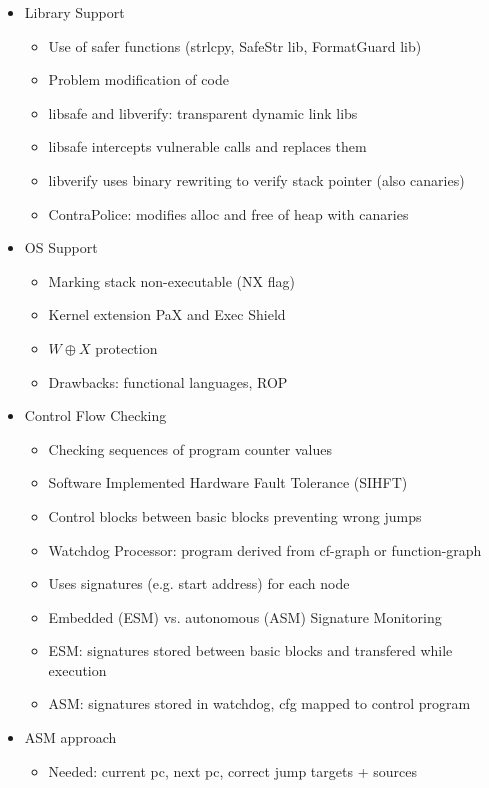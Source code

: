 \documentclass[11pt, paper=a4, twocolumn]{scrartcl}
\begin{document}
\begin{itemize}
\begin{itemize}
					\item Library Support
						\begin{itemize}
							\item Use of safer functions (strlcpy, SafeStr lib, FormatGuard lib)
							\item Problem modification of code
							\item libsafe and libverify: transparent dynamic link libs
							\item libsafe intercepts vulnerable calls and replaces them
							\item libverify uses binary rewriting to verify stack pointer (also canaries)
							\item ContraPolice: modifies alloc and free of heap with canaries
						\end{itemize}
					\item OS Support
						\begin{itemize}
							\item Marking stack non-executable (NX flag)
							\item Kernel extension PaX and Exec Shield
							\item $W\oplus X$ protection
							\item Drawbacks: functional languages, ROP
						\end{itemize}
					\item Control Flow Checking
						\begin{itemize}
							\item Checking sequences of program counter values
							\item Software Implemented Hardware Fault Tolerance (SIHFT)
							\item Control blocks between basic blocks preventing wrong jumps
							\item Watchdog Processor: program derived from cf-graph or function-graph
							\item Uses signatures (e.g. start address) for each node
							\item Embedded (ESM) vs. autonomous (ASM) Signature Monitoring
							\item ESM: signatures stored between basic blocks and transfered while execution
							\item ASM: signatures stored in watchdog, cfg mapped to control program
						\end{itemize}
					\item ASM approach
						\begin{itemize}
							\item Needed: current pc, next pc, correct jump targets + sources

\end{itemize}
\end{itemize}
\end{itemize}
\end{document}
